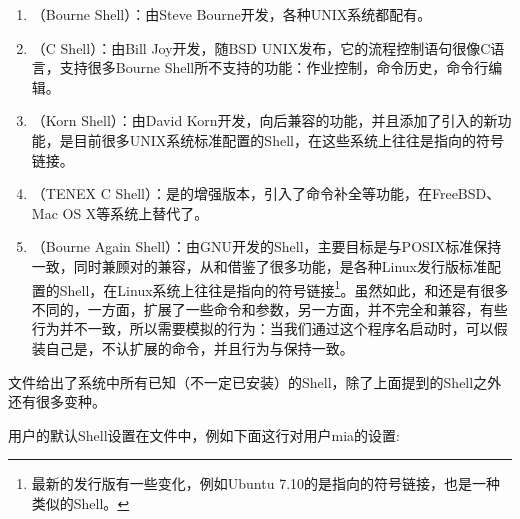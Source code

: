 \begin{enumerate}

\item {}（Bourne Shell）：由Steve Bourne开发，各种UNIX系统都配有。

\item {}（C Shell）：由Bill Joy开发，随BSD UNIX发布，它的流程控制语句很像C语言，支持很多Bourne Shell所不支持的功能：作业控制，命令历史，命令行编辑。

\item {}（Korn Shell）：由David Korn开发，向后兼容的功能，并且添加了引入的新功能，是目前很多UNIX系统标准配置的Shell，在这些系统上往往是指向的符号链接。

\item {}（TENEX C Shell）：是的增强版本，引入了命令补全等功能，在FreeBSD、Mac OS X等系统上替代了。

\item {}（Bourne Again Shell）：由GNU开发的Shell，主要目标是与POSIX标准保持一致，同时兼顾对的兼容，从和借鉴了很多功能，是各种Linux发行版标准配置的Shell，在Linux系统上往往是指向的符号链接\footnote[38]{最新的发行版有一些变化，例如Ubuntu 7.10的是指向的符号链接，也是一种类似的Shell。
}。虽然如此，和还是有很多不同的，一方面，扩展了一些命令和参数，另一方面，并不完全和兼容，有些行为并不一致，所以需要模拟的行为：当我们通过这个程序名启动时，可以假装自己是，不认扩展的命令，并且行为与保持一致。
\end{enumerate}


文件给出了系统中所有已知（不一定已安装）的Shell，除了上面提到的Shell之外还有很多变种。




用户的默认Shell设置在文件中，例如下面这行对用户mia的设置:


